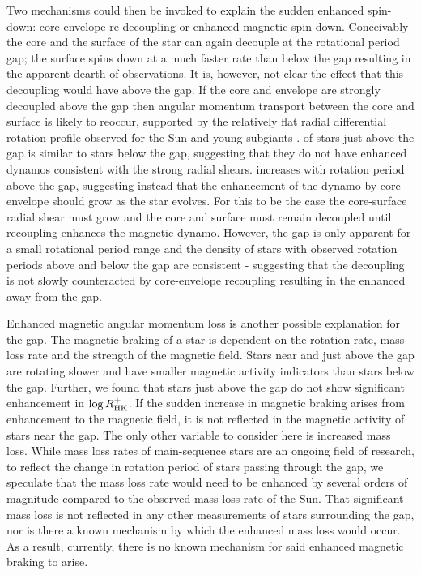 Two mechanisms could then be invoked to explain the sudden enhanced spin-down: core-envelope re-decoupling or enhanced magnetic spin-down.
Conceivably the core and the surface of the star can again decouple at the rotational period gap; the surface spins down at a much faster rate than below the gap resulting in the apparent dearth of observations.
It is, however, not clear the effect that this decoupling would have above the gap.
If the core and envelope are strongly decoupled above the gap then angular momentum transport between the core and surface is likely to reoccur, supported by the relatively flat radial differential rotation profile observed for the Sun and young subgiants \citep{deheuvels_seismic_2015}.
\rper{} of stars just above the gap is similar to stars below the gap, suggesting that they do not have enhanced dynamos consistent with the strong radial shears.
\rper{} increases with rotation period above the gap, suggesting instead that the enhancement of the dynamo by core-envelope should grow as the star evolves.
For this to be the case the core-surface radial shear must grow and the core and surface must remain decoupled until recoupling enhances the magnetic dynamo.
However, the gap is only apparent for a small rotational period range and the density of stars with observed rotation periods above and below the gap are consistent - suggesting that the decoupling is not slowly counteracted by core-envelope recoupling resulting in the enhanced \rper{} away from the gap.

Enhanced magnetic angular momentum loss is another possible explanation for the gap.
The magnetic braking of a star is dependent on the rotation rate, mass loss rate and the strength of the magnetic field.
Stars near and just above the gap are rotating slower and have smaller magnetic activity indicators than stars below the gap.
Further, we found that stars just above the gap do not show significant enhancement in $\log R^{+}_{\rm{HK}}$.
If the sudden increase in magnetic braking arises from enhancement to the magnetic field, it is not reflected in the magnetic activity of stars near the gap.
The only other variable to consider here is increased mass loss.
While mass loss rates of main-sequence stars are an ongoing field of research, to reflect the change in rotation period of stars passing through the gap, we speculate that the mass loss rate would need to be enhanced by several orders of magnitude compared to the observed mass loss rate of the Sun. 
That significant mass loss is not reflected in any other measurements of stars surrounding the gap, nor is there a known mechanism by which the enhanced mass loss would occur.
As a result, currently, there is no known mechanism for said enhanced magnetic braking to arise.

